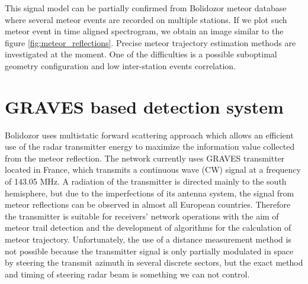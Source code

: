 \documentclass[twoside]{ctuthesis}
\theoremstyle{plain}
\theoremstyle{definition}
\theoremstyle{note}
\begin{document}
This signal model can be partially confirmed from Bolidozor meteor database where several meteor events are recorded on multiple stations. If we plot such meteor event in time aligned spectrogram, we obtain an image similar to the figure \ref{fig:meteor_reflections}.
Precise meteor trajectory estimation methods are investigated at the moment.  One of the difficulties is a possible suboptimal geometry configuration and low inter-station events correlation.

\section{GRAVES based detection system}

Bolidozor uses multistatic forward scattering approach which allows an efficient use of the radar transmitter energy to maximize the information value collected from the meteor reflection.
The network currently uses GRAVES \cite{GRAVES_radar} transmitter located in France, which transmits a continuous wave (CW) signal at a frequency of 143.05 MHz. A radiation of the transmitter is directed mainly to the south hemisphere, but due to the imperfections of its antenna system, the signal from meteor reflections can be observed in almost all European countries. Therefore the transmitter is suitable for receivers' network operations with the aim of meteor trail detection and the development of algorithms for the calculation of meteor trajectory. Unfortunately, the use of a distance measurement method is not possible because the transmitter signal is only partially modulated in space by steering the transmit azimuth in several discrete sectors, but the exact method and timing of steering radar beam is something we can not control. 
\end{document}
